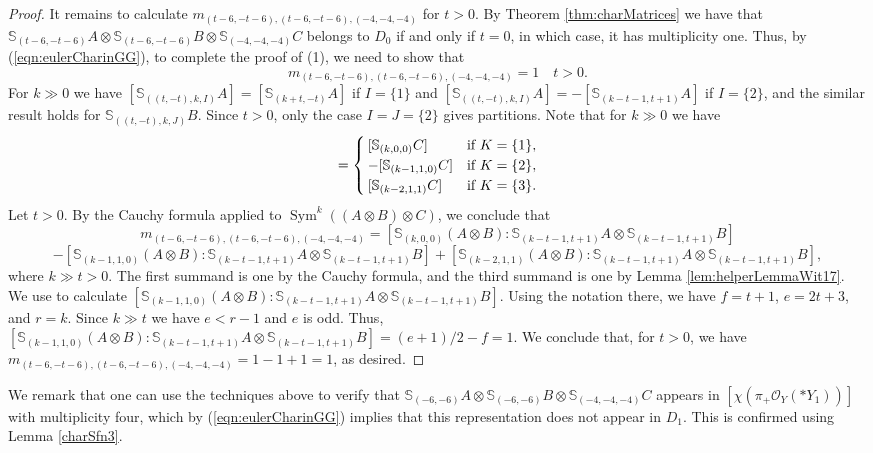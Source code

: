 \documentclass[11pt,reqno]{amsart}
\newcommand{\oo}{\otimes}
\newcommand{\bS}{\mathbb{S}}
\newcommand{\tn}{\textnormal}
\newcommand{\Sym}{\operatorname{Sym}}
\newcommand{\mc}[1]{\mathcal{#1}}
\numberwithin{equation}{section}
\begin{document}
\begin{proof}
It remains to calculate $m_{(t-6,-t-6),(t-6,-t-6),(-4,-4,-4)}$ for $t>0$. By Theorem \ref{thm:charMatrices} we have that $\bS_{(t-6,-t-6)}A\oo \bS_{(t-6,-t-6)}B \oo \bS_{(-4,-4,-4)}C$ belongs to $D_0$ if and only if $t=0$, in which case, it has multiplicity one. Thus, by (\ref{eqn:eulerCharinGG}), to complete the proof of (1), we need to show that
$$
m_{(t-6,-t-6),(t-6,-t-6),(-4,-4,-4)}=1\quad t>0.
$$
For $k\gg 0$ we have $[\bS_{((t,-t),k,I)}A]=[\bS_{(k+t,-t)}A]$ if $I=\{1\}$ and $[\bS_{((t,-t),k,I)}A]=-[\bS_{(k-t-1,t+1)}A]$ if $I=\{2\}$, and the similar result holds for $\bS_{((t,-t),k,J)}B$. Since $t>0$, only the case $I=J=\{2\}$ gives partitions. Note that for $k\gg 0$ we have
\begin{equation}
[\bS_{((0,0,0),k,K)}C]=\begin{cases}
[\bS_{(k,0,0)}C] & \tn{if $K=\{1\}$},\\
-[\bS_{(k-1,1,0)}C] & \tn{if $K=\{2\}$},\\
[\bS_{(k-2,1,1)}C] & \tn{if $K=\{3\}$}.
\end{cases}
\end{equation}
Let $t>0$. By the Cauchy formula applied to $\Sym^{k}((A\oo B)\oo C)$, we conclude that
$$
m_{(t-6,-t-6),(t-6,-t-6),(-4,-4,-4)}=[\bS_{(k,0,0)}(A\oo B):\bS_{(k-t-1,t+1)}A\oo \bS_{(k-t-1,t+1)}B]
$$
$$
-[\bS_{(k-1,1,0)}(A\oo B):\bS_{(k-t-1,t+1)}A\oo \bS_{(k-t-1,t+1)}B]+[\bS_{(k-2,1,1)}(A\oo B):\bS_{(k-t-1,t+1)}A\oo \bS_{(k-t-1,t+1)}B],
$$
where $k\gg t>0$. The first summand is one by the Cauchy formula, and the third summand is one by Lemma \ref{lem:helperLemmaWit17}. We use \cite[Corollary 4.3b]{raicu2012secant} to calculate $[\bS_{(k-1,1,0)}(A\oo B):\bS_{(k-t-1,t+1)}A\oo \bS_{(k-t-1,t+1)}B]$. Using the notation there, we have $f=t+1$, $e=2t+3$, and $r=k$. Since $k\gg t$ we have $e<r-1$ and $e$ is odd. Thus, $[\bS_{(k-1,1,0)}(A\oo B):\bS_{(k-t-1,t+1)}A\oo \bS_{(k-t-1,t+1)}B]=(e+1)/2-f=1$. We conclude that, for $t>0$,  we have $m_{(t-6,-t-6),(t-6,-t-6),(-4,-4,-4)}=1-1+1=1$, as desired.
\end{proof}

We remark that one can use the techniques above to verify that $\bS_{(-6,-6)}A\oo \bS_{(-6,-6)}B \oo \bS_{(-4,-4,-4)}C$ appears in $[\chi(\pi_{+}\mc{O}_Y(\ast Y_1))]$ with multiplicity four, which by (\ref{eqn:eulerCharinGG}) implies that this representation does not appear in $D_1$. This is confirmed using Lemma \ref{charSfn3}.
\end{document}
